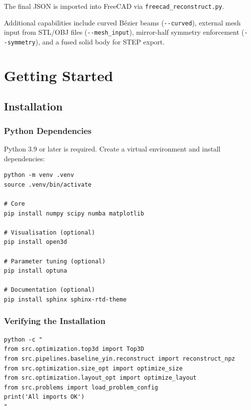\documentclass[a4paper, 11pt, openany]{report}
\begin{document}
The final JSON is imported into FreeCAD via \texttt{freecad\_reconstruct.py}.

Additional capabilities include curved B\'ezier beams (\texttt{-{}-curved}),
external mesh input from STL/OBJ files (\texttt{-{}-mesh\_input}), mirror-half
symmetry enforcement (\texttt{-{}-symmetry}), and a fused solid body for STEP
export.


\chapter{Getting Started}
\label{ch:getting-started}

\section{Installation}
\label{sec:installation}

\subsection{Python Dependencies}

Python 3.9 or later is required.  Create a virtual environment and install
dependencies:

\begin{lstlisting}[style=bashstyle]
python -m venv .venv
source .venv/bin/activate

# Core
pip install numpy scipy numba matplotlib

# Visualisation (optional)
pip install open3d

# Parameter tuning (optional)
pip install optuna

# Documentation (optional)
pip install sphinx sphinx-rtd-theme
\end{lstlisting}

\subsection{Verifying the Installation}

\begin{lstlisting}[style=bashstyle]
python -c "
from src.optimization.top3d import Top3D
from src.pipelines.baseline_yin.reconstruct import reconstruct_npz
from src.optimization.size_opt import optimize_size
from src.optimization.layout_opt import optimize_layout
from src.problems import load_problem_config
print('All imports OK')
"
\end{lstlisting}
\end{document}
